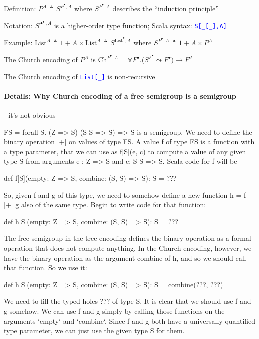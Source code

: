Definition: $P^{A}\triangleq S^{P^{\bullet},A}$ where $S^{P^{\bullet},A}$
describes the \textsf{``}induction principle\textsf{''}

Notation: {\footnotesize{}$S^{\bullet^{\bullet},A}$} is a higher-order
type function; Scala syntax: \texttt{\textcolor{blue}{\footnotesize{}S{[}\_{[}\_{]},A{]}}} 

Example: $\text{List}^{A}\triangleq1+A\times\text{List}^{A}\triangleq S^{\text{List}^{\bullet},A}$
where $S^{P^{\bullet},A}\triangleq1+A\times P^{A}$ 

The Church encoding of $P^{A}$ is {\footnotesize{}$\text{Ch}^{P^{\bullet},A}=\forall F^{\bullet}.\big(S^{F^{\bullet}}\leadsto F^{\bullet}\big)\rightarrow F^{A}$}{\footnotesize\par}

The Church encoding of \texttt{\textcolor{blue}{\footnotesize{}List{[}\_{]}}}
is non-recursive

\paragraph{Details: Why Church encoding of a free semigroup is a semigroup}

- it\textsf{'}s not obvious

FS = forall S. (Z => S) \texttimes{} (S \texttimes{} S => S) => S
is a semigroup.  We need to define the binary operation |+| on values
of type FS. A value f of type FS is a function with a type parameter,
that we can use as f{[}S{]}(e, c) to compute a value of any given
type S from arguments e : Z => S and c: S \texttimes{} S => S. Scala
code for f will be

def f{[}S{]}(empty: Z => S, combine: (S, S) => S): S = ???

So, given f and g of this type, we need to somehow define a new function
h = f |+| g also of the same type. Begin to write code for that function:

def h{[}S{]}(empty: Z => S, combine: (S, S) => S): S = ???

The free semigroup in the tree encoding defines the binary operation
as a formal operation that does not compute anything. In the Church
encoding, however, we have the binary operation as the argument \textquotedbl combine\textquotedbl{}
of h, and so we should call that function. So we use it:

def h{[}S{]}(empty: Z => S, combine: (S, S) => S): S = combine(???,
???)

We need to fill the typed holes ??? of type S. It is clear that we
should use f and g somehow. We can use f and g simply by calling those
functions on the arguments `empty` and `combine`. Since f and g both
have a universally quantified type parameter, we can just use the
given type S for them.


